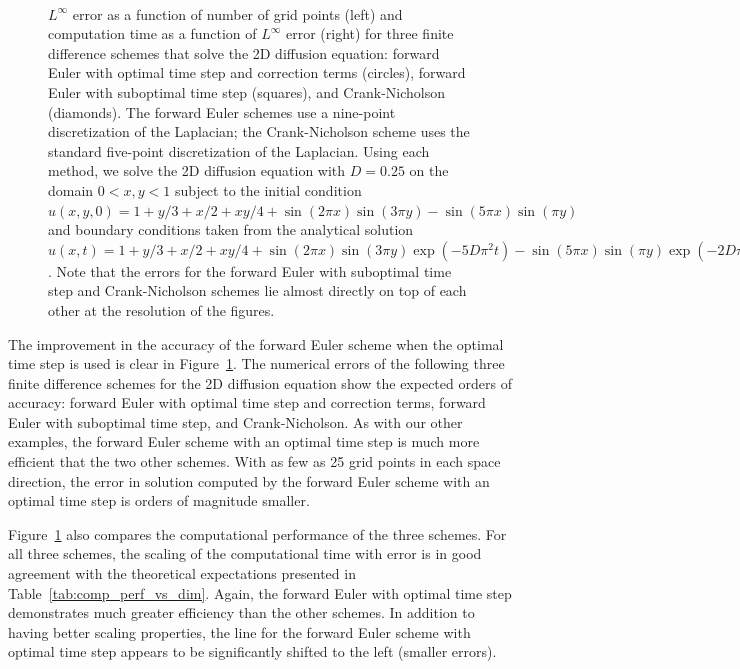 \documentclass[oneeqnum,onefignum,onetabnum,onethmnum]{siamltex}
\begin{document}
\begin{figure}[htb]
\begin{center}
\ \ 
\caption{$L^\infty$ error as a function of number of grid points (left)
and computation time as a function of $L^\infty$ error (right) for three
finite difference schemes that solve the 2D diffusion equation:
forward Euler with optimal time step and correction terms (circles), forward 
Euler with suboptimal time step (squares), and Crank-Nicholson (diamonds).  
The forward Euler schemes use a nine-point discretization of the Laplacian;
the Crank-Nicholson scheme uses the standard five-point discretization of
the Laplacian.  Using each method, we solve the 2D diffusion equation with 
$D = 0.25$ on the domain $0 < x, y < 1$ subject to the initial condition
$u(x,y,0) =  1 + y/3 + x/2 + xy/4 
          + \sin(2 \pi x) \sin(3 \pi y) - \sin(5 \pi x) \sin(\pi y)$
and boundary conditions taken from the analytical solution 
$u(x,t) = 1 + y/3 + x/2 + xy/4 
          + \sin(2 \pi x) \sin(3 \pi y) \exp(-5 D \pi^2 t) 
          - \sin(5 \pi x) \sin(\pi y) \exp(-2 D \pi^2 t)
$.
Note that the errors for the forward Euler with suboptimal time step and 
Crank-Nicholson schemes lie almost directly on top of each other at the 
resolution of the figures.
}
\label{fig:diffusion_eqn_2d_src_analysis}
\end{center}
\end{figure}

The improvement in the accuracy of the forward Euler scheme when the optimal 
time step is used is clear in Figure~\ref{fig:diffusion_eqn_2d_src_analysis}.
The numerical errors of the following three finite difference schemes for 
the 2D diffusion equation show the expected orders of accuracy: forward Euler 
with optimal time step and correction terms, forward Euler with suboptimal 
time step, and Crank-Nicholson.  As with our other examples, the forward 
Euler scheme with an optimal time step is much more efficient that the two 
other schemes.  With as few as 25 grid points in each space direction, the 
error in solution computed by the forward Euler scheme with an optimal time 
step is orders of magnitude smaller. 

Figure~\ref{fig:diffusion_eqn_2d_src_analysis} also compares the computational
performance of the three schemes.  For all three schemes, the scaling of the 
computational time with error is in good agreement with the theoretical 
expectations presented in Table~\ref{tab:comp_perf_vs_dim}.  Again, the 
forward Euler with optimal time step demonstrates much greater efficiency 
than the other schemes.  In addition to having better scaling properties, 
the line for the forward Euler scheme with optimal time step appears to be 
significantly shifted to the left (\ie smaller errors).
\end{document}
